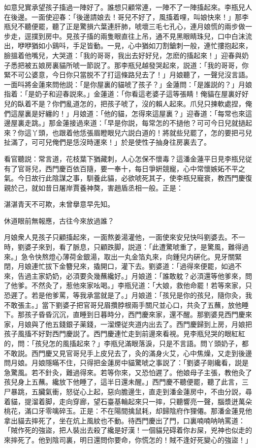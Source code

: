 如意兒實承望孩子搐過一陣好了。誰想只顧常連，一陣不了一陣搐起來。李瓶兒人在後邊。一面使迎春：「後邊請娘去！哥兒不好了，風搐着哩，叫娘快來！」那李瓶兒不聽便罷，聽了正是驚損六葉連肝肺，唬壞三毛七孔心，連月娘慌的兩步做一步走，逕撲到房中。見孩子搐的兩隻眼直往上吊，通不見黑眼睛珠兒，口中白沫流出，咿咿猶如小鷄呌，手足皆動。一見，心中猶如刀割鎗刺一般，連忙摟抱起來，臉搵着他嘴兒，大哭道：「我的哥哥，我出去好好兒，怎麽的搐起來！」迎春與奶子悉把被五娘房裏貓所唬一節説了。那李瓶兒越發哭起來，説道：「我的哥哥，你緊不可公婆意，今日你只當脱不了打這條路兒去了！」月娘聽了，一聲兒沒言語。一面呌將金蓮來問他説：「是你屋裏的貓唬了孩子？」金蓮問：「是誰説的？」月娘指着：「是奶子和迎春説來。」金蓮道：「你看這老婆子這等張睛！俺貓在屋裏好好兒的臥着不是？你們亂道怎的，把孩子唬了，沒的賴人起來。爪兒只揀軟處捏，俺們這屋裏是好纏的！」月娘道：「他的貓，怎得來這屋裏？」迎春道：「每常也來這邊屋裏走跳。」那金蓮接過來道：「早是你説，每常怎的不撾他？可可今日兒就撾起來？你這丫頭，也跟着他恁張眉瞪眼兒六説白道的！將就些兒罷了，怎的要把弓兒扯滿了，可可兒俺們是恁沒時運來！」於是使性子抽身往房裏去了。

看官聽説：常言道，花枝葉下猶藏刺，人心怎保不懷毒？這潘金蓮平日見李瓶兒従有了官哥兒，西門慶百依百隨，要一奉十，每日爭姸競寵，心中常懷嫉妬不平之氣。今日故行此陰謀之事，馴養此貓，必欲唬死其子，使李瓶兒寵衰，教西門慶復親於己，就如昔日屠岸賈養神獒，害趙盾丞相一般。正是：

\begin{myquote}
湛湛青天不可欺，未曾擧意早先知。

休道眼前無報應，古往今來放過誰？
\end{myquote}

月娘衆人見孩子只顧搐起來，一面熬姜湯灌他，一面使來安兒快呌劉婆去。不一時，劉婆子來到，看了脈息，只顧跌脚，説道：「此遭驚唬重了，是驚風，難得過來。」急令快熬燈心薄荷金銀湯，取出一丸金箔丸來，向鍾兒内硏化。見牙關緊閉，月娘連忙拔下金簪兒來，撬開口，灌下去。劉婆道：「過得來便罷，如過不來，告過主家奶奶，必湏要灸幾蘸纔好。」月娘道：「誰敢躭？必湏還等他爹來，問了他爹。不然灸了，惹他來家吆喝。」李瓶兒道：「大娘，救他命罷！若等來家，只恐遲了。若是他爹罵，等我承當就是了。」月娘道：「孩兒是你的孩兒，隨你灸，我不敢張主。」當下劉婆子把官哥兒眉攢脖根兩手關尺並心口，共灸了五蘸，放他睡下。那孩子昏昏沉沉，直睡到日暮時分，西門慶來家，還不醒。那劉婆見西門慶來家，月娘與了他五錢銀子薬錢，一溜煙従夾道内出去了。西門慶歸到上房，月娘把孩子風搐不好對西門慶説了。西門慶連忙走到前邊來看視。見李瓶兒哭的眼紅紅的，問：「孩兒怎的風搐起來？」李瓶兒滿眼落淚，只是不言語。問丫頭奶子，都不敢説。西門慶又見官哥兒手上皮兒去了，灸的滿身火艾，心中焦燥，又走到後邊問月娘。月娘隱瞞不住，只得把金蓮房中貓驚唬之事説了：「劉婆子剛纔看，説是急驚風。若不針灸，難過得來。若等你來，又恐怕遲了。他娘母子主張，教他灸了孩兒身上五蘸。纔放下他睡了，這半日還未醒。」西門慶不聽便罷，聽了此言，三尸暴跳，五臟氣衝，怒従心上起，惡向膽邊生，直走到潘金蓮房中，不由分説，尋着貓，提溜着脚，走向穿廊，望石臺基輪起來只一摔，只聽響亮一聲，腦漿迸萬朵桃花，滿口牙零噙碎玉。正是：不在陽間擒鼠耗，却歸陰府作狸僊。那潘金蓮見他拿出貓去摔死了，坐在炕上風紋也不動。待西門慶出了門，口裏喃喃呐呐罵道：「賊作死的強盜，把人裝出去殺了纔是好漢！一個貓兒碍着你お屎，兇神也似走的來摔死了。他到陰司裏，明日還問你要命，你慌怎的！賊不逢好死變心的強盜！」

